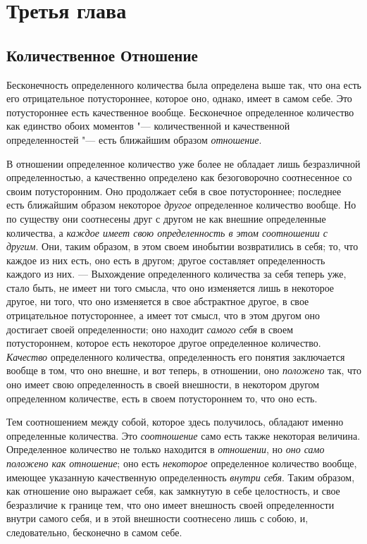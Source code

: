 \chapter*{Третья глава}
\section*{Количественное Отношение}

Бесконечность определенного количества была определена выше так, что она
есть его отрицательное потустороннее, которое оно, однако, имеет в самом
себе. Это потустороннее есть качественное вообще. Бесконечное определенное
количество как единство обоих моментов "--- количественной и качественной
определенностей "--- есть ближайшим образом
{\em отношение}.

В отношении определенное количество уже более не обладает лишь безразличной
определенностью, а качественно определено как безоговорочно соотнесенное со
своим потусторонним. Оно продолжает себя в свое потустороннее; последнее
есть ближайшим образом некоторое {\em другое}
определенное количество вообще. Но по существу они соотнесены друг с другом
не как внешние определенные количества, а {\em каждое
имеет свою определенность в этом соотношении с другим}. Они, таким образом,
в этом своем инобытии возвратились в себя; то, что каждое из них есть, оно
есть в другом; другое составляет определенность каждого из них. —
Выхождение определенного количества за себя теперь уже, стало быть, не
имеет ни того смысла, что оно изменяется лишь в некоторое другое, ни того,
что оно изменяется в свое абстрактное другое, в свое отрицательное
потустороннее, а имеет тот смысл, что в этом другом оно достигает своей
определенности; оно находит {\em самого себя} в своем
потустороннем, которое есть некоторое другое определенное количество.
{\em Качество} определенного количества, определенность
его понятия заключается вообще в том, что оно внешне, и вот теперь, в
отношении, оно {\em положено} так, что оно имеет свою
определенность в своей внешности, в некотором другом определенном
количестве, есть в своем потустороннем то, что оно есть.

Тем соотношением между собой, которое здесь получилось, обладают именно
определенные количества. Это {\em соотношение} само
есть также некоторая величина. Определенное количество не только находится
в {\em отношении}, но {\em оно само
положено как отношение}; оно есть {\em некоторое}
определенное количество вообще, имеющее указанную качественную
определенность {\em внутри себя}. Таким образом, как
отношение оно выражает себя, как замкнутую в себе целостность, и свое
безразличие к границе тем, что оно имеет внешность своей определенности
внутри самого себя, и в этой внешности соотнесено лишь с собою, и,
следовательно, бесконечно в самом себе.

